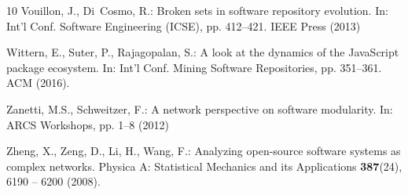 \documentclass[smallextended]{svjour3}       %
\begin{document}
\begin{thebibliography}{10}
Vouillon, J., Di~Cosmo, R.: Broken sets in software repository evolution.
\newblock In: Int'l Conf. Software Engineering ({ICSE}), pp. 412--421. IEEE
  Press (2013)

Wittern, E., Suter, P., Rajagopalan, S.: A look at the dynamics of the
  {JavaScript} package ecosystem.
\newblock In: Int'l Conf. Mining Software Repositories, pp. 351--361. ACM
  (2016).
\newblock {}

Zanetti, M.S., Schweitzer, F.: A network perspective on software modularity.
\newblock In: {ARCS} Workshops, pp. 1--8 (2012)

Zheng, X., Zeng, D., Li, H., Wang, F.: Analyzing open-source software systems
  as complex networks.
\newblock Physica A: Statistical Mechanics and its Applications
  \textbf{387}(24), 6190 -- 6200 (2008).
\newblock {}

\end{thebibliography}
\end{document}
